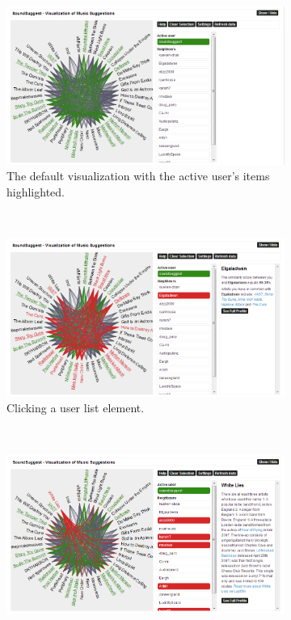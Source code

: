\begin{figure}
	\centering
	\begin{subfigure}[t]{0.3\textwidth}
					\centering
					\includegraphics[width=\textwidth]{img/prototype_soundsuggest3_default}
					\caption{The default visualization with the active user's items highlighted.}
					\label{figure:prototype_soundsuggest3_default}
	\end{subfigure}%
	~
	\begin{subfigure}[t]{0.3\textwidth}
					\centering
					\includegraphics[width=\textwidth]{img/prototype_soundsuggest3_user_click}
					\caption{Clicking a user list element.}
					\label{figure:prototype_soundsuggest3_user_click}
	\end{subfigure}
	~
	\begin{subfigure}[t]{0.3\textwidth}
					\centering
					\includegraphics[width=\textwidth]{img/prototype_soundsuggest3_item_click}

\end{subfigure}
\end{figure}
